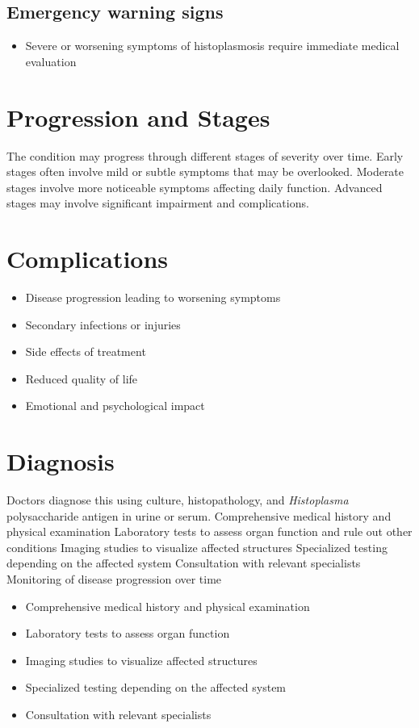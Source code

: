 \subsection{Emergency warning signs}
\begin{itemize}[noitemsep]
  \item Severe or worsening symptoms of histoplasmosis require immediate medical evaluation
\end{itemize}
\section{Progression and Stages}
The condition may progress through different stages of severity over time. Early stages often involve mild or subtle symptoms that may be overlooked. Moderate stages involve more noticeable symptoms affecting daily function. Advanced stages may involve significant impairment and complications.
\section{Complications}
\begin{itemize}[noitemsep]
  \item Disease progression leading to worsening symptoms
  \item Secondary infections or injuries
  \item Side effects of treatment
  \item Reduced quality of life
  \item Emotional and psychological impact
\end{itemize}
\section{Diagnosis}
Doctors diagnose this using culture, histopathology, and \textit{Histoplasma} polysaccharide antigen in urine or serum. Comprehensive medical history and physical examination Laboratory tests to assess organ function and rule out other conditions Imaging studies to visualize affected structures Specialized testing depending on the affected system Consultation with relevant specialists Monitoring of disease progression over time

\begin{itemize}[noitemsep]
  \item Comprehensive medical history and physical examination
  \item Laboratory tests to assess organ function
  \item Imaging studies to visualize affected structures
  \item Specialized testing depending on the affected system
  \item Consultation with relevant specialists
\end{itemize}
